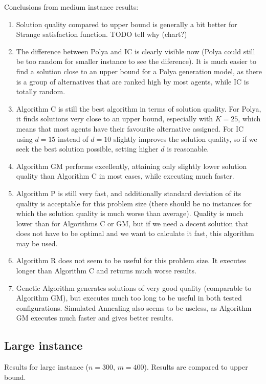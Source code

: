 Conclusions from medium instance results:
\begin{enumerate}
	\item Solution quality compared to upper bound is generally a bit better for Strange satisfaction function. TODO tell why (chart?)
	\item The difference between Polya and IC is clearly visible now (Polya could still be too random for smaller instance to see the diference). It is much easier to find a solution close to an upper bound for a Polya generation model, as there is a group of alternatives that are ranked high by most agents, while IC is totally random.
	\item Algorithm C is still the best algorithm in terms of solution quality. For Polya, it finds solutions very close to an upper bound, especially with $K = 25$, which means that most agents have their favourite alternative assigned. For IC using $d = 15$ instead of $d = 10$ slightly improves the solution quality, so if we seek the best solution possible, setting higher $d$ is reasonable.
	\item Algorithm GM performs excellently, attaining only slightly lower solution quality than Algorithm C in most cases, while executing much faster.
	\item Algorithm P is still very fast, and additionally standard deviation of its quality is acceptable for this problem size (there should be no instances for which the solution quality is much worse than average). Quality is much lower than for Algorithms C or GM, but if we need a decent solution that does not have to be optimal and we want to calculate it fast, this algorithm may be used.
	\item Algorithm R does not seem to be useful for this problem size. It executes longer than Algorithm C and returns much worse results.
	\item Genetic Algorithm generates solutions of very good quality (comparable to Algorithm GM), but executes much too long to be useful in both tested configurations. Simulated Annealing also seems to be useless, as Algorithm GM executes much faster and gives better results.
\end{enumerate}

\subsection{Large instance}

Results for large instance ($n = 300$, $m = 400$). Results are compared to upper bound.
\\

